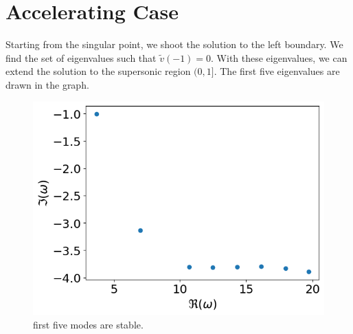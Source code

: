 \section{Accelerating Case}
Starting from the singular point, we shoot the solution to the left boundary. We find the set of eigenvalues such that $\tilde{v}(-1)=0$. With these eigenvalues, we can extend the solution to the supersonic region $(0,1]$. The first five eigenvalues are drawn in the graph.
\begin{figure} [H]
	\centering
	\includegraphics[width=0.7\linewidth]{img/accelerating-v}
	\caption{first five modes are stable.}
	\label{fig:accelerating-v}
\end{figure}

